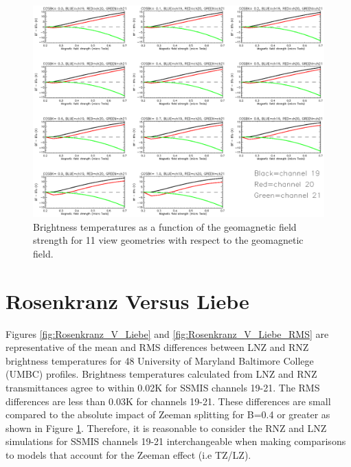 \begin{figure}[htp]
  \centering{}
  \includegraphics[scale=0.8]{./graphics/TZ_results.eps}
  \caption{Brightness temperatures as a function of the geomagnetic field strength for 11 view geometries with
   respect to the geomagnetic field.}
  \label{fig:TZ_results}
\end{figure}

\newpage
\section{Rosenkranz Versus Liebe}

Figures \ref{fig:Rosenkranz_V_Liebe} and \ref{fig:Rosenkranz_V_Liebe_RMS} are representative of the mean and RMS differences between LNZ and RNZ brightness
temperatures for 48 University of Maryland Baltimore College (UMBC) profiles.
Brightness temperatures calculated from LNZ and RNZ transmittances agree to within 0.02K for SSMIS channels 19-21. The RMS differences are less than
0.03K for channels 19-21.  
These differences are small compared to the absolute impact of Zeeman splitting for B=0.4\microtesla{} 
or greater as shown in Figure \ref{fig:TZ_results}. Therefore, it is reasonable to consider the RNZ and LNZ simulations for SSMIS channels 19-21
interchangeable when making comparisons to models that account for the Zeeman effect (i.e TZ/LZ). 


